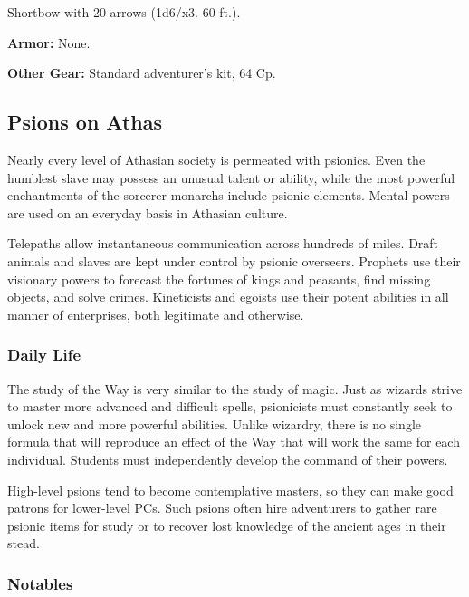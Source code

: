 Shortbow with 20 arrows (1d6/x3. 60 ft.).

\textbf{Armor:} None.

\textbf{Other Gear:} Standard adventurer's kit, 64 Cp.

\subsection{Psions on Athas}

Nearly every level of Athasian society is permeated with psionics. Even the humblest slave may possess an unusual talent or ability, while the most powerful enchantments of the sorcerer-monarchs include psionic elements. Mental powers are used on an everyday basis in Athasian culture.

Telepaths allow instantaneous communication across hundreds of miles. Draft animals and slaves are kept under control by psionic overseers. Prophets use their visionary powers to forecast the fortunes of kings and peasants, find missing objects, and solve crimes. Kineticists and egoists use their potent abilities in all manner of enterprises, both legitimate and otherwise.

\subsubsection{Daily Life}

The study of the Way is very similar to the study of magic. Just as wizards strive to master more advanced and difficult spells, psionicists must constantly seek to unlock new and more powerful abilities. Unlike wizardry, there is no single formula that will reproduce an effect of the Way that will work the same for each individual. Students must independently develop the command of their powers.

High-level psions tend to become contemplative masters, so they can make good patrons for lower-level PCs. Such psions often hire adventurers to gather rare psionic items for study or to recover lost knowledge of the ancient ages in their stead.

\subsubsection{Notables}

